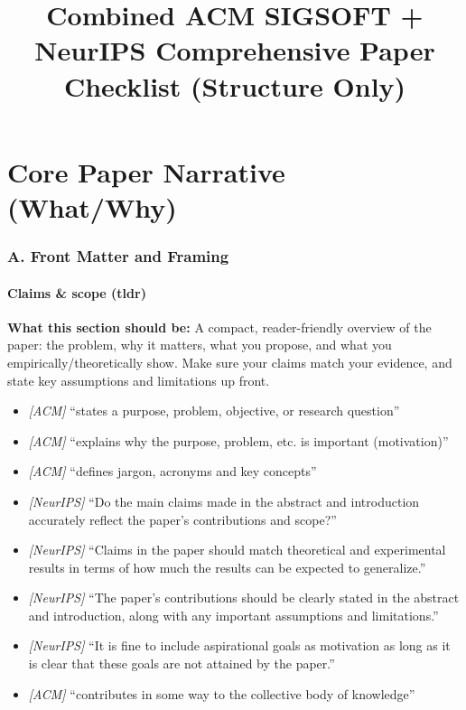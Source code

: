 \documentclass[11pt]{article}
\begin{document}
\title{Combined ACM SIGSOFT + NeurIPS Comprehensive Paper Checklist (Structure Only)}
\author{}
\date{}
\maketitle

\tableofcontents
\newpage

\part{Core Paper Narrative (What/Why)}

\section*{A. Front Matter and Framing}

\subsection{Claims & scope (tldr)}
\noindent\textbf{What this section should be:}
A compact, reader-friendly overview of the paper: the problem, why it matters, what you propose, and what you empirically/theoretically show. Make sure your claims match your evidence, and state key assumptions and limitations up front.
\begin{itemize}
  \item \textit{[ACM]} ``states a purpose, problem, objective, or research question''
  \item \textit{[ACM]} ``explains why the purpose, problem, etc. is important (motivation)''
  \item \textit{[ACM]} ``defines jargon, acronyms and key concepts''
  \item \textit{[NeurIPS]} ``Do the main claims made in the abstract and introduction accurately reflect the paper's contributions and scope?''
  \item \textit{[NeurIPS]} ``Claims in the paper should match theoretical and experimental results in terms of how much the results can be expected to generalize.''
  \item \textit{[NeurIPS]} ``The paper's contributions should be clearly stated in the abstract and introduction, along with any important assumptions and limitations.''
  \item \textit{[NeurIPS]} ``It is fine to include aspirational goals as motivation as long as it is clear that these goals are not attained by the paper.''
  \item \textit{[ACM]} ``contributes in some way to the collective body of knowledge''
\end{itemize}
\end{document}
